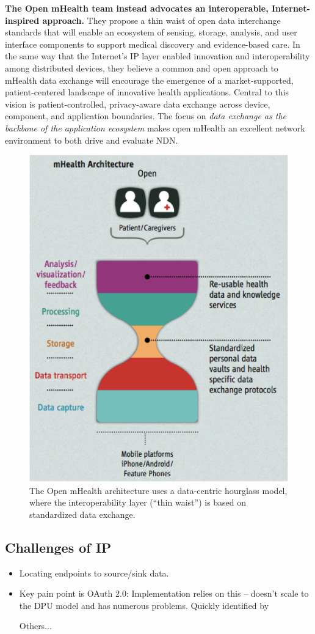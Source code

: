 \textbf{The Open mHealth team instead advocates an interoperable,  Internet-inspired
approach.} They propose a thin waist of open data interchange standards
that will enable an ecosystem of sensing, storage, analysis, and user
interface components to support medical
discovery and evidence-based care.  In the same way that the Internet's
IP layer enabled innovation and interoperability among distributed
devices, they believe a common and open approach to mHealth data exchange
will  encourage the emergence of a market-supported, patient-centered
landscape of innovative health applications. Central to this vision is
patient-controlled, privacy-aware data exchange across device, component,
and application boundaries.  The focus on \emph{data exchange as the
backbone of the application ecosystem} makes open mHealth an excellent
network environment to both drive and evaluate NDN.

\begin{figure}
\begin{center}
\includegraphics[width=.4\textwidth]{figures/mHealth-hourglass}
\caption{The Open mHealth architecture uses a data-centric hourglass model, where the interoperability layer (``thin waist'') is based on standardized data exchange.~\cite{SimEstrin2010}}
\label{fig:mHealth}
\end{center}
\end{figure}

\subsection{Challenges of IP}

\begin{itemize}
\item Locating endpoints to source/sink data.
\item Key pain point is OAuth 2.0:  Implementation relies on this – doesn’t scale to the DPU model and has numerous problems.  Quickly identified by 
\item [Others...] 
\end{itemize}

